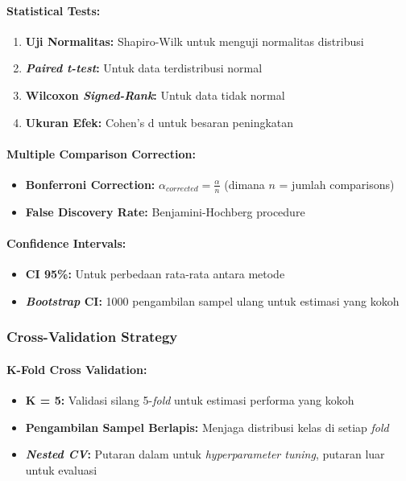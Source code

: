 \documentclass[12pt,a4paper]{article}
\begin{document}
\paragraph{Statistical Tests:}
\begin{enumerate}[label=\arabic*., leftmargin=*, nosep]
\item \textbf{Uji Normalitas:} Shapiro-Wilk untuk menguji normalitas distribusi
\item \textbf{\textit{Paired t-test}:} Untuk data terdistribusi normal
\item \textbf{Wilcoxon \textit{Signed-Rank}:} Untuk data tidak normal
\item \textbf{Ukuran Efek:} Cohen's d untuk besaran peningkatan
\end{enumerate}

\paragraph{Multiple Comparison Correction:}
\begin{itemize}[leftmargin=*, nosep]
\item \textbf{Bonferroni Correction:} $\alpha_{corrected} = \frac{\alpha}{n}$ (dimana $n$ = jumlah comparisons)
\item \textbf{False Discovery Rate:} Benjamini-Hochberg procedure
\end{itemize}

\paragraph{Confidence Intervals:}
\begin{itemize}[leftmargin=*, nosep]
\item \textbf{CI 95\%:} Untuk perbedaan rata-rata antara metode
\item \textbf{\textit{Bootstrap} CI:} 1000 pengambilan sampel ulang untuk estimasi yang kokoh
\end{itemize}

\subsubsection{Cross-Validation Strategy}
\paragraph{K-Fold Cross Validation:}
\begin{itemize}[leftmargin=*, nosep]
\item \textbf{K = 5:} Validasi silang 5-\textit{fold} untuk estimasi performa yang kokoh
\item \textbf{Pengambilan Sampel Berlapis:} Menjaga distribusi kelas di setiap \textit{fold}
\item \textbf{\textit{Nested CV}:} Putaran dalam untuk \textit{hyperparameter tuning}, putaran luar untuk evaluasi
\end{itemize}
\end{document}
